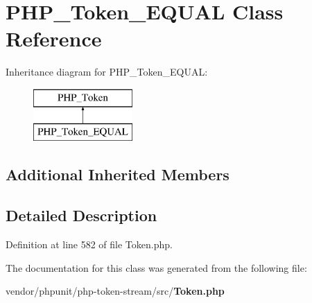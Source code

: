 \section{P\+H\+P\+\_\+\+Token\+\_\+\+E\+Q\+U\+A\+L Class Reference}
\label{class_p_h_p___token___e_q_u_a_l}
Inheritance diagram for P\+H\+P\+\_\+\+Token\+\_\+\+E\+Q\+U\+A\+L\+:\begin{figure}[H]
\begin{center}
\leavevmode
\includegraphics[height=2.000000cm]{class_p_h_p___token___e_q_u_a_l}
\end{center}
\end{figure}
\subsection*{Additional Inherited Members}


\subsection{Detailed Description}


Definition at line 582 of file Token.\+php.



The documentation for this class was generated from the following file\+:\begin{DoxyCompactItemize}
\item 
vendor/phpunit/php-\/token-\/stream/src/{\bf Token.\+php}\end{DoxyCompactItemize}
